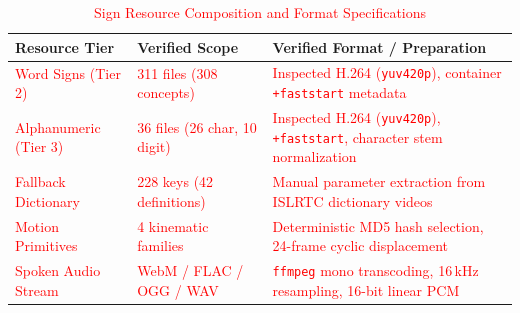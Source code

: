 \documentclass[conference,a4paper,10pt]{IEEEtran}
\begin{document}
\begin{table}[t]
\centering
\caption{\textcolor{red}{Sign Resource Composition and Format Specifications}}
\label{tab:dataset}
\begin{tabularx}{\columnwidth}{@{}l >{\raggedright\arraybackslash}p{2.3cm} >{\raggedright\arraybackslash}X@{}}
\toprule
\textbf{Resource Tier} & \textbf{Verified Scope} & \textbf{Verified Format / Preparation} \\
\midrule
\textcolor{red}{Word Signs (Tier 2)} & \textcolor{red}{311 files (308 concepts)} & \textcolor{red}{Inspected H.264 (\texttt{yuv420p}), container \texttt{+faststart} metadata} \\
\textcolor{red}{Alphanumeric (Tier 3)} & \textcolor{red}{36 files (26 char, 10 digit)} & \textcolor{red}{Inspected H.264 (\texttt{yuv420p}), \texttt{+faststart}, character stem normalization} \\
\textcolor{red}{Fallback Dictionary} & \textcolor{red}{228 keys (42 definitions)} & \textcolor{red}{Manual parameter extraction from ISLRTC dictionary videos} \\
\textcolor{red}{Motion Primitives} & \textcolor{red}{4 kinematic families} & \textcolor{red}{Deterministic MD5 hash selection, 24-frame cyclic displacement} \\
\textcolor{red}{Spoken Audio Stream} & \textcolor{red}{WebM / FLAC / OGG / WAV} & \textcolor{red}{\texttt{ffmpeg} mono transcoding, 16\,kHz resampling, 16-bit linear PCM} \\
\bottomrule
\end{tabularx}
\end{table}
\end{document}
